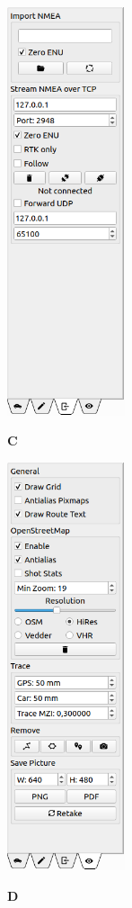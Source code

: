\documentclass[12pt]{article} %
\begin{document}
\noindent\begin{minipage}{0.25\textwidth}  
\noindent\includegraphics[width=\textwidth,height=12cm]{./screens/map_import_panel.png}
\begin{center}
{\bf C}
\end{center}
\end{minipage}
\noindent\begin{minipage}{0.25\textwidth}  
\noindent\includegraphics[width=\textwidth,height=12cm]{./screens/map_view_panel.png}
\begin{center}
{\bf D}
\end{center}
\end{minipage}
\end{document}

